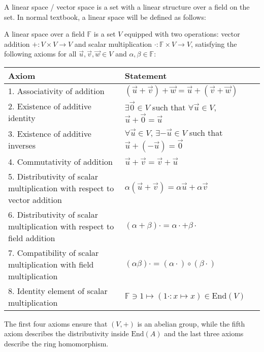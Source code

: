 \documentclass[
	11pt, %
	fleqn, %
	a4paper, %
]{LegrandOrangeBook}
\newcommand{\End}[1]{\text{End}(#1)} %
\newcommand{\F}{\mathbb{F}} %
\begin{document}
A linear space / vector space is a set with a linear structure over a field on the set. In normal textbook, a linear space will be defined as follows:

\begin{corollary}
    A linear space over a field $\F$ is a set $V$ equipped with two operations: vector addition $+: V \times V \to V$ and scalar multiplication $\cdot : \F \times V \to V$, satisfying the following axioms for all $\vec{u}, \vec{v}, \vec{w} \in V$ and $\alpha, \beta \in \F$:
    \begin{center}
        \begin{tabularx}{\textwidth}{XX}
            \toprule
            \textbf{Axiom} & \textbf{Statement} \\
            \midrule
            1. Associativity of addition & $(\vec{u} + \vec{v}) + \vec{w} = \vec{u} + (\vec{v} + \vec{w})$ \\
            2. Existence of additive identity & $\exists \vec{0} \in V$ such that $\forall \vec{u} \in V$, $\vec{u} + \vec{0} = \vec{u}$ \\
            3. Existence of additive inverses & $\forall \vec{u} \in V$, $\exists -\vec{u} \in V$ such that $\vec{u} + (-\vec{u}) = \vec{0}$ \\
            4. Commutativity of addition & $\vec{u} + \vec{v} = \vec{v} + \vec{u}$ \\
            5. Distributivity of scalar multiplication with respect to vector addition & $\alpha (\vec{u} + \vec{v}) = \alpha \vec{u} + \alpha \vec{v}$ \\
            6. Distributivity of scalar multiplication with respect to field addition & $(\alpha + \beta) \cdot = \alpha \cdot + \beta \cdot$ \\
            7. Compatibility of scalar multiplication with field multiplication & $(\alpha \beta) \cdot = (\alpha \cdot) \circ (\beta \cdot)$ \\
            8. Identity element of scalar multiplication & $\F \ni 1 \mapsto (1\cdot : x \mapsto x) \in \End{V}$ \\
            \bottomrule
        \end{tabularx}
    \end{center}
\end{corollary}

\begin{remark}
    The first four axioms ensure that $(V, +)$ is an abelian group, while the fifth axiom describes the distributivity inside $\End{A}$ and the last three axioms describe the ring homomorphism.
\end{remark}
\end{document}
